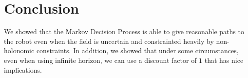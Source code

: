\documentclass[a4paper]{article}
\begin{document}
\section{Conclusion}
We showed that the Markov Decision Process is able to give reasonable paths
to the robot even when the field is uncertain and constrainted heavily by
non-holonomic constraints. In addition, we showed that under some circumstances,
even when using infinite horizon, we can use a discount factor of $1$ that has
nice implications.
\end{document}
